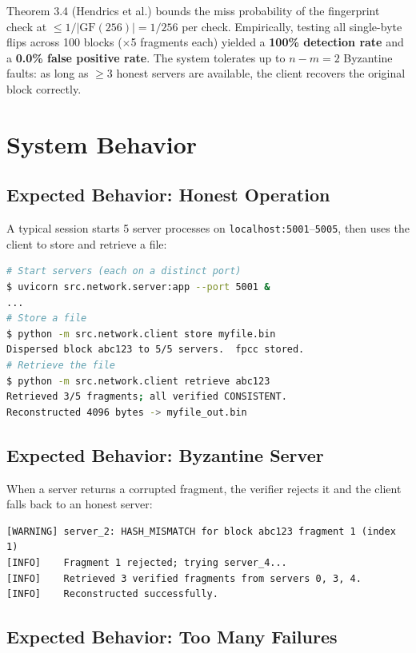 \documentclass[10pt]{article}
\begin{document}
Theorem 3.4 (Hendrics et al.) bounds the miss probability of the fingerprint check at
$\leq 1/|\mathrm{GF}(256)| = 1/256$ per check.  Empirically, testing all single-byte
flips across 100 blocks ($\times$5 fragments each) yielded a \textbf{100\% detection
rate} and a \textbf{0.0\% false positive rate}.  The system tolerates up to $n - m = 2$
Byzantine faults: as long as $\geq 3$ honest servers are available, the client recovers
the original block correctly.

\section{System Behavior}

\subsection{Expected Behavior: Honest Operation}

A typical session starts 5 server processes on \texttt{localhost:5001}--\texttt{5005},
then uses the client to store and retrieve a file:

\begin{lstlisting}[language=bash]
# Start servers (each on a distinct port)
$ uvicorn src.network.server:app --port 5001 &
...
# Store a file
$ python -m src.network.client store myfile.bin
Dispersed block abc123 to 5/5 servers.  fpcc stored.
# Retrieve the file
$ python -m src.network.client retrieve abc123
Retrieved 3/5 fragments; all verified CONSISTENT.
Reconstructed 4096 bytes -> myfile_out.bin
\end{lstlisting}

\subsection{Expected Behavior: Byzantine Server}

When a server returns a corrupted fragment, the verifier rejects it and the client falls
back to an honest server:

\begin{lstlisting}
[WARNING] server_2: HASH_MISMATCH for block abc123 fragment 1 (index 1)
[INFO]    Fragment 1 rejected; trying server_4...
[INFO]    Retrieved 3 verified fragments from servers 0, 3, 4.
[INFO]    Reconstructed successfully.
\end{lstlisting}

\subsection{Expected Behavior: Too Many Failures}
\end{document}
